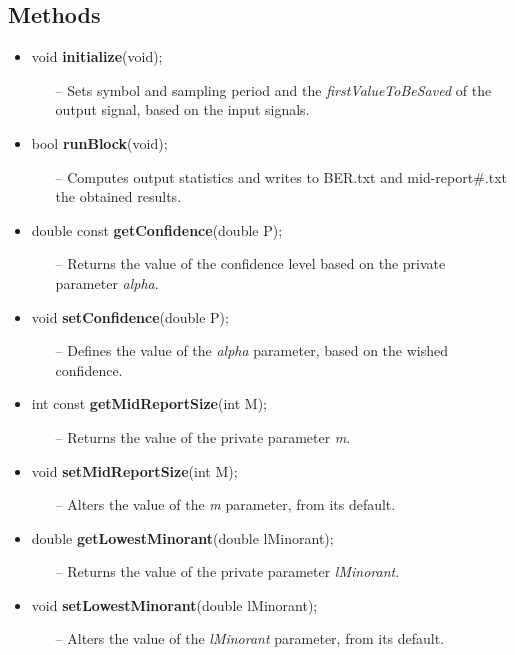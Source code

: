 \begin{refsection}
\subsection*{Methods}

\begin{itemize}
  \item void \textbf{initialize}(void);
  \begin{itemize}
    \item[--] Sets symbol and sampling period and the \textit{firstValueToBeSaved} of the output signal, based on the input signals.
  \end{itemize}
  \item bool \textbf{runBlock}(void);
  \begin{itemize}
    \item[--] Computes output statistics and writes to BER.txt and mid-report\#.txt the obtained results.
  \end{itemize}
  \item double const \textbf{getConfidence}(double P);
  \begin{itemize}
    \item[--] Returns the value of the confidence level based on the private parameter \textit{alpha}.
  \end{itemize}
  \item void \textbf{setConfidence}(double P);
  \begin{itemize}
    \item[--] Defines the value of the \textit{alpha} parameter, based on the wished confidence.
  \end{itemize}
  \item int const \textbf{getMidReportSize}(int M);
  \begin{itemize}
    \item[--] Returns the value of the private parameter \textit{m}.
  \end{itemize}
  \item void \textbf{setMidReportSize}(int M);
  \begin{itemize}
    \item[--] Alters the value of the \textit{m} parameter, from its default.
  \end{itemize}
  \item double \textbf{getLowestMinorant}(double lMinorant);
  \begin{itemize}
    \item[--] Returns the value of the private parameter \textit{lMinorant}.
  \end{itemize}
  \item void \textbf{setLowestMinorant}(double lMinorant);
  \begin{itemize}
    \item[--] Alters the value of the \textit{lMinorant} parameter, from its default.
  \end{itemize}
\end{itemize}



\end{refsection}
